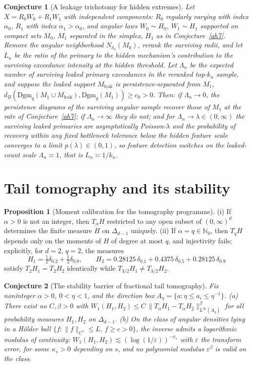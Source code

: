 \documentclass[11pt]{article}
\newtheorem{conjecture}{Conjecture}
\theoremstyle{definition}
\newcommand{\eps}{\varepsilon}
\newtheorem{proposition}{Proposition}
\begin{document}
\begin{conjecture}[A leakage trichotomy for hidden extremes]\label{ah8}
Let $X=R_0W_0+R_1W_1$ with independent components: $R_0$ regularly varying with index $\alpha_0$, $R_1$ with index $\alpha_1>\alpha_0$, and angular laws $W_0\sim H_0$, $W_1\sim H_1$ supported on compact sets $M_0$, $M_1$ separated in the simplex, $H_1$ as in Conjecture~\ref{ah7}.  Remove the angular neighborhood $N_{\delta_n}(M_0)$, rerank the surviving radii, and let $L_n$ be the ratio of the primary to the hidden mechanism's contribution to the surviving exceedance intensity at the hidden threshold.  Let $\Lambda_n$ be the expected number of surviving leaked primary exceedances in the reranked top-$k_n$ sample, and suppose the leaked support $M_{\mathrm{leak}}$ is persistence-separated from $M_1$, $d_B(\mathrm{Dgm}_q(M_1\cup M_{\mathrm{leak}}),\mathrm{Dgm}_q(M_1))\ge c_0>0$.  Then: if $\Lambda_n\to0$, the persistence diagrams of the surviving angular sample recover those of $M_1$ at the rate of Conjecture~\ref{ah7}; if $\Lambda_n\to\infty$ they do not; and for $\Lambda_n\to\lambda\in(0,\infty)$ the surviving leaked primaries are asymptotically Poisson-$\lambda$ and the probability of recovery within any fixed bottleneck tolerance below the hidden feature scale converges to a limit $p(\lambda)\in(0,1)$, so feature detection switches on the leaked-count scale $\Lambda_n\asymp1$, that is $L_n\asymp1/k_n$.
\end{conjecture}

\section{Tail tomography and its stability}

\begin{proposition}[Moment calibration for the tomography programme]\label{ah:moment}
(i) If $\alpha>0$ is not an integer, then $T_\alpha H$ restricted to any open subset of $(0,\infty)^d$ determines the finite measure $H$ on $\Delta_{d-1}$ uniquely.  (ii) If $\alpha=q\in\mathbb N_0$, then $T_qH$ depends only on the moments of $H$ of degree at most $q$, and injectivity fails; explicitly, for $d=2$, $q=2$, the measures
\[
H_1=\tfrac12\delta_{0.2}+\tfrac12\delta_{0.8},\qquad
H_2=0.28125\,\delta_{0.1}+0.4375\,\delta_{0.5}+0.28125\,\delta_{0.9}
\]
satisfy $T_2H_1=T_2H_2$ identically while $T_{3/2}H_1\ne T_{3/2}H_2$.
\end{proposition}

\begin{conjecture}[The stability barrier of fractional tail tomography]\label{ah9}
Fix noninteger $\alpha>0$, $0<\eta<1$, and the direction box $A_\eta=\{a:\eta\le a_i\le\eta^{-1}\}$.  (a) There exist no $C,\beta>0$ with $W_1(H_1,H_2)\le C\,\lVert T_\alpha H_1-T_\alpha H_2\rVert_{L^\infty(A_\eta)}^\beta$ for all probability measures $H_1,H_2$ on $\Delta_{d-1}$.  (b) On the class of angular densities lying in a H\"older ball $\{f:\lVert f\rVert_{C^s}\le L,\ f\ge c>0\}$, the inverse admits a logarithmic modulus of continuity: $W_1(H_1,H_2)\lesssim(\log(1/\eps))^{-\kappa_s}$ with $\eps$ the transform error, for some $\kappa_s>0$ depending on $s$, and no polynomial modulus $\eps^\beta$ is valid on the class.
\end{conjecture}
\end{document}
